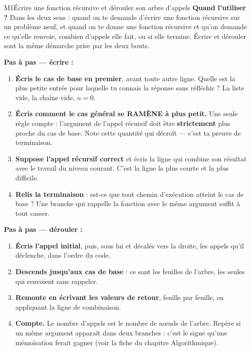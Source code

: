 \begin{fichemethode}{M1}{Écrire une fonction récursive et dérouler son arbre d'appels}
\textbf{Quand l'utiliser ?} Dans les deux sens : quand on te demande d'écrire une fonction
récursive sur un problème neuf, et quand on te donne une fonction récursive et qu'on demande
ce qu'elle renvoie, combien d'appels elle fait, ou si elle termine. Écrire et dérouler sont la
même démarche prise par les deux bouts.

\textbf{Pas à pas — écrire :}
\begin{enumerate}
  \item \textbf{Écris le cas de base en premier}, avant toute autre ligne. Quelle est la plus
    petite entrée pour laquelle tu connais la réponse sans réfléchir ? La liste vide, la
    chaîne vide, $n = 0$.
  \item \textbf{Écris comment le cas général se RAMÈNE à plus petit.} Une seule règle compte :
    l'argument de l'appel récursif doit être \textbf{strictement} plus proche du cas de base.
    Note cette quantité qui décroît — c'est ta preuve de terminaison.
  \item \textbf{Suppose l'appel récursif correct} et écris la ligne qui combine son résultat
    avec le travail du niveau courant. C'est la ligne la plus courte et la plus difficile.
  \item \textbf{Relis la terminaison} : est-ce que tout chemin d'exécution atteint le cas de
    base ? Une branche qui rappelle la fonction avec le même argument suffit à tout casser.
\end{enumerate}

\textbf{Pas à pas — dérouler :}
\begin{enumerate}
  \item \textbf{Écris l'appel initial}, puis, sous lui et décalés vers la droite, les appels
    qu'il déclenche, dans l'ordre du code.
  \item \textbf{Descends jusqu'aux cas de base} : ce sont les feuilles de l'arbre, les seules
    qui renvoient sans rappeler.
  \item \textbf{Remonte en écrivant les valeurs de retour}, feuille par feuille, en appliquant
    la ligne de combinaison.
  \item \textbf{Compte.} Le nombre d'appels est le nombre de nœuds de l'arbre. Repère si un
    même argument apparaît dans deux branches : c'est le signe qu'une mémoïsation ferait
    gagner (voir la fiche du chapitre Algorithmique).
\end{enumerate}


\end{fichemethode}

